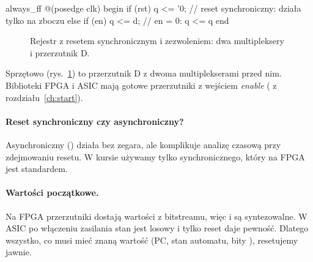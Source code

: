 \begin{sv}
always_ff @(posedge clk) begin
  if (rst)     q <= '0;      // reset synchroniczny: działa tylko na zboczu
  else if (en) q <= d;       // en = 0: q <= q
end
\end{sv}

\begin{figure}[h]
\centering
{}
\caption{Rejestr z resetem synchronicznym i zezwoleniem: dwa multipleksery i przerzutnik D.}
\label{fig:regen}
\end{figure}

Sprzętowo (rys.~\ref{fig:regen}) to przerzutnik D z dwoma multiplekserami
przed nim. Biblioteki FPGA i ASIC mają gotowe przerzutniki z wejściem
\emph{enable} ( z rozdziału~\ref{ch:start}).

\paragraph{Reset synchroniczny czy asynchroniczny?} Asynchroniczny
() działa bez zegara, ale
komplikuje analizę czasową przy zdejmowaniu resetu. W kursie używamy tylko
synchronicznego, który na FPGA jest standardem.

\paragraph{Wartości początkowe.} Na FPGA przerzutniki dostają wartości z
bitstreamu, więc  i  są syntezowalne. W ASIC
po włączeniu zasilania stan jest losowy i tylko reset daje pewność. Dlatego
wszystko, co musi mieć znaną wartość (PC, stan automatu, bity ),
resetujemy jawnie.

